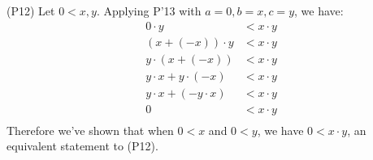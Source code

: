 \documentclass[12pt]{article}
\begin{document}
\begin{enumerate}
(P12) Let $0<x,y$. Applying P'13 with $a=0, b=x, c=y$, we have:
\begin{align}
		0\cdot y &< x\cdot y \tag{P'13}\\
             (x + (-x)) \cdot y &< x\cdot y \tag{P3}\\
		y \cdot (x + (-x)) &< x\cdot y \tag{P4}\\
		y\cdot x + y\cdot (-x) &< x\cdot y \tag{P9}\\
		y\cdot x + (-y\cdot x) &< x\cdot y \tag{P8}\\
		0 &< x\cdot y \tag{P3}\\
\end{align}
Therefore we've shown that when $0<x$ and $0<y$, we have $0<x\cdot y$, an equivalent statement to (P12).


\end{enumerate}
\end{document}
